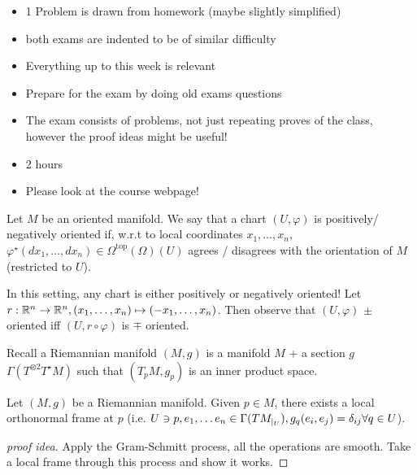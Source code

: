 
\begin{itemize}
    \item 1 Problem is drawn from homework (maybe slightly simplified)
    \item both exams are indented to be of similar difficulty
    \item Everything up to this week is relevant
    \item Prepare for the exam by doing old exams questions 
    \item The exam consists of problems, not just repeating proves of the class, however the proof ideas might be useful!
    \item 2 hours
    \item Please look at the course webpage! 
\end{itemize}

\begin{definition*}
    Let \(M\) be an oriented manifold. We say that a chart \((U,\varphi)\) is positively/ negatively 
    oriented if, w.r.t to local coordinates \(x_1,\dots,x_n\), \(\varphi^\star(dx_1,\dots,dx_n)\in\Omega^{\text{top}}(\Omega)(U)\) agrees / disagrees with 
    the orientation of \(M\) (restricted to \(U\)). 
\end{definition*}

In this setting, any chart is either positively or negatively oriented! Let \(r:\mathbb{R}^n\to\mathbb{R}^n,(x_1,\dots,x_n)\mapsto (-x_1,\dots,x_n)\).
Then observe that \((U,\varphi)\) \(\pm\) oriented  iff \((U,r\circ \varphi)\) is \(\mp\) oriented.

Recall a Riemannian manifold \((M,g)\) is a manifold \(M\) + a section \(g\)
\(\Gamma(T^{\otimes 2}T^\star M)\) such that
\((T_p M,g_p)\) is an inner product space.  

Let \((M,g)\) be a Riemannian manifold. Given \(p\in M\), there exists a local orthonormal 
frame at \(p\) (i.e. \(U\ni p,e_1,\dots e_n\in \Gamma(TM_{|_{U}}),g_q(e_i,e_j)=\delta_{ij}\forall q\in U\)).
\begin{proof}[proof idea]
    Apply the Gram-Schmitt process, all the operations are smooth. Take a local frame through this process and show it works.
\end{proof}

